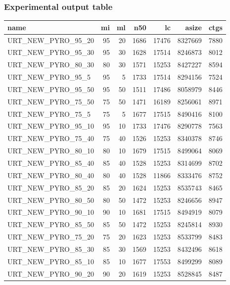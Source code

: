 \documentclass[a4paper, twoside]{article}
\begin{document}
\subsubsection{Experimental output table}
\label{sec:org908453b}
\begin{center}
\label{tab:org873c812}
\begin{tabular}{lrrrrrr}
\hline
name & mi & ml & n50 & lc & asize & ctgs\\
\hline
URT\_NEW\_PYRO\_95\_20 & 95 & 20 & 1686 & 17476 & 8327669 & 7880\\
URT\_NEW\_PYRO\_95\_30 & 95 & 30 & 1628 & 17514 & 8246873 & 8012\\
URT\_NEW\_PYRO\_80\_30 & 80 & 30 & 1571 & 15253 & 8427227 & 8594\\
URT\_NEW\_PYRO\_95\_5 & 95 & 5 & 1733 & 17514 & 8294156 & 7524\\
URT\_NEW\_PYRO\_95\_50 & 95 & 50 & 1511 & 17486 & 8058979 & 8446\\
URT\_NEW\_PYRO\_75\_50 & 75 & 50 & 1471 & 16189 & 8256061 & 8971\\
URT\_NEW\_PYRO\_75\_5 & 75 & 5 & 1677 & 17515 & 8490416 & 8100\\
URT\_NEW\_PYRO\_95\_10 & 95 & 10 & 1733 & 17476 & 8290778 & 7563\\
URT\_NEW\_PYRO\_75\_40 & 75 & 40 & 1526 & 15253 & 8340378 & 8746\\
URT\_NEW\_PYRO\_80\_10 & 80 & 10 & 1679 & 17515 & 8499064 & 8069\\
URT\_NEW\_PYRO\_85\_40 & 85 & 40 & 1528 & 15253 & 8314699 & 8702\\
URT\_NEW\_PYRO\_80\_40 & 80 & 40 & 1528 & 11866 & 8333476 & 8752\\
URT\_NEW\_PYRO\_85\_20 & 85 & 20 & 1624 & 15253 & 8535743 & 8465\\
URT\_NEW\_PYRO\_80\_50 & 80 & 50 & 1472 & 15253 & 8246656 & 8947\\
URT\_NEW\_PYRO\_90\_10 & 90 & 10 & 1681 & 17515 & 8494919 & 8079\\
URT\_NEW\_PYRO\_85\_50 & 85 & 50 & 1472 & 15253 & 8245814 & 8930\\
URT\_NEW\_PYRO\_75\_20 & 75 & 20 & 1623 & 15253 & 8533799 & 8483\\
URT\_NEW\_PYRO\_85\_30 & 85 & 30 & 1569 & 15253 & 8432496 & 8618\\
URT\_NEW\_PYRO\_85\_10 & 85 & 10 & 1677 & 17553 & 8499299 & 8089\\
URT\_NEW\_PYRO\_90\_20 & 90 & 20 & 1619 & 15253 & 8528845 & 8487\\

\end{tabular}
\end{center}
\end{document}
